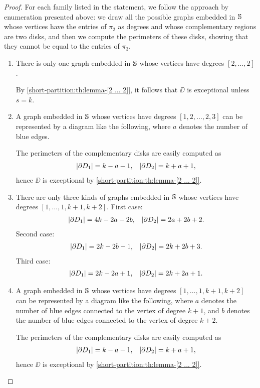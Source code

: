 \begin{proof}
For each family listed in the statement, we follow the approach by enumeration presented above: we draw all the possible graphs embedded in $\mathbb{S}{}$ whose vertices have the entries of $\pi_2$ as degrees and whose complementary regions are two disks, and then we compute the perimeters of these disks, showing that they cannot be equal to the entries of $\pi_3$.
\begin{enumerate}[(1)]
\item There is only one graph embedded in $\mathbb{S}{}$ whose vertices have degrees $[2,\ldots,2]$.

By \cref{short-partition:th:lemma-[2 ... 2]}, it follows that $\DD$ is exceptional unless $s=k$.
\item A graph embedded in $\mathbb{S}{}$ whose vertices have degrees $[1,2,\ldots,2,3]$ can be represented by a diagram like the following, where $a$ denotes the number of blue edges.

The perimeters of the complementary disks are easily computed as
\begin{align*}
\lvert \partial D_1\rvert=k-a-1,&&\lvert \partial D_2\rvert=k+a+1,
\end{align*}
hence $\DD$ is exceptional by \cref{short-partition:th:lemma-[2 ... 2]}.
\item There are only three kinds of graphs embedded in $\mathbb{S}$ whose vertices have degrees $[1,\ldots,1,k+1,k+2]$.
First case:
\begin{align*}
\lvert \partial D_1\rvert=4k-2a-2b,&&\lvert \partial D_2\rvert=2a+2b+2.
\end{align*}
Second case:
\begin{align*}
\lvert \partial D_1\rvert=2k-2b-1,&&\lvert \partial D_2\rvert=2k+2b+3.
\end{align*}
Third case:
\begin{align*}
\lvert \partial D_1\rvert=2k-2a+1,&&\lvert \partial D_2\rvert=2k+2a+1.
\end{align*}
\item A graph embedded in $\mathbb{S}$ whose vertices have degrees $[1,\ldots,1,k+1,k+2]$ can be represented by a diagram like the following, where $a$ denotes the number of blue edges connected to the vertex of degree $k+1$, and $b$ denotes the number of blue edges connected to the vertex of degree $k+2$.

The perimeters of the complementary disks are easily computed as
\begin{align*}
\lvert \partial D_1\rvert=k-a-1,&&\lvert \partial D_2\rvert=k+a+1,
\end{align*}
hence $\DD$ is exceptional by \cref{short-partition:th:lemma-[2 ... 2]}.
\end{enumerate}
\end{proof}

